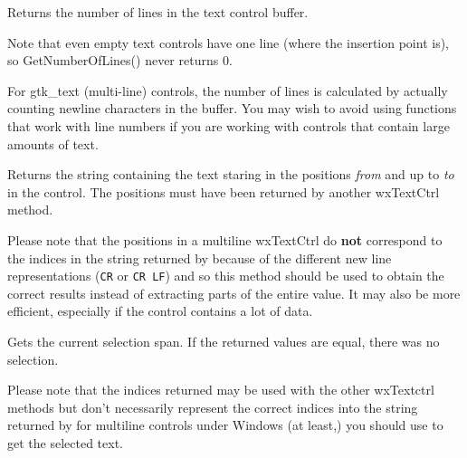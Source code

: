 
Returns the number of lines in the text control buffer.


Note that even empty text controls have one line (where the insertion point
is), so GetNumberOfLines() never returns 0.

For gtk\_text (multi-line) controls, the number of lines is
calculated by actually counting newline characters in the buffer. You
may wish to avoid using functions that work with line numbers if you are
working with controls that contain large amounts of text.

\label{wxtextctrlgetrange}


Returns the string containing the text staring in the positions {\it from} and
up to {\it to} in the control. The positions must have been returned by another
wxTextCtrl method.

Please note that the positions in a multiline wxTextCtrl do {\bf not}
correspond to the indices in the string returned by 
 because of the different new line
representations ({\tt CR} or {\tt CR LF}) and so this method should be used to
obtain the correct results instead of extracting parts of the entire value. It
may also be more efficient, especially if the control contains a lot of data.

\label{wxtextctrlgetselection}


Gets the current selection span. If the returned values are equal, there was
no selection.

Please note that the indices returned may be used with the other wxTextctrl
methods but don't necessarily represent the correct indices into the string
returned by  for multiline controls
under Windows (at least,) you should use
 to get the selected
text.




